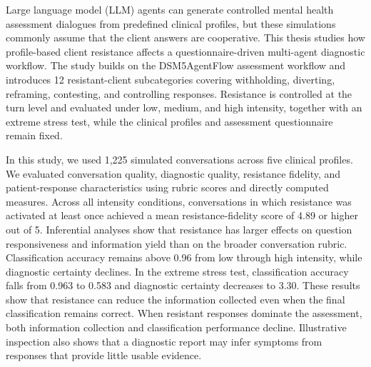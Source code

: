 Large language model (LLM) agents can generate controlled mental health assessment dialogues from predefined clinical profiles, but these simulations commonly assume that the client answers are cooperative. This thesis studies how profile-based client resistance affects a questionnaire-driven multi-agent diagnostic workflow. The study builds on the DSM5AgentFlow assessment workflow and introduces 12 resistant-client subcategories covering withholding, diverting, reframing, contesting, and controlling responses. Resistance is controlled at the turn level and evaluated under low, medium, and high intensity, together with an extreme stress test, while the clinical profiles and assessment questionnaire remain fixed.

In this study, we used 1,225 simulated conversations across five clinical profiles. We evaluated conversation quality, diagnostic quality, resistance fidelity, and patient-response characteristics using rubric scores and directly computed measures. Across all intensity conditions, conversations in which resistance was activated at least once achieved a mean resistance-fidelity score of 4.89 or higher out of 5. Inferential analyses show that resistance has larger effects on question responsiveness and information yield than on the broader conversation rubric. Classification accuracy remains above 0.96 from low through high intensity, while diagnostic certainty declines. In the extreme stress test, classification accuracy falls from 0.963 to 0.583 and diagnostic certainty decreases to 3.30. These results show that resistance can reduce the information collected even when the final classification remains correct. When resistant responses dominate the assessment, both information collection and classification performance decline. Illustrative inspection also shows that a diagnostic report may infer symptoms from responses that provide little usable evidence.
